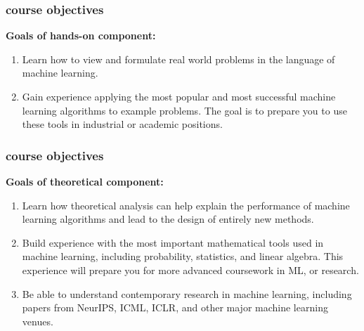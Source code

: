\documentclass[handout,compress]{beamer}
\begin{document}
\begin{frame}
	\frametitle{course objectives}
	\textbf{Goals of hands-on component:}
	\begin{enumerate}
		\item Learn how to view and formulate real world problems in the language of machine learning. 
		\item Gain experience applying the most popular and most successful machine learning algorithms to example problems. The goal is to prepare you to use these tools in industrial or academic positions.
	\end{enumerate}
\end{frame}

\begin{frame}
	\frametitle{course objectives}
	\textbf{Goals of theoretical component:}
	\begin{enumerate}
		\item Learn how theoretical analysis can help explain the performance of machine learning algorithms and lead to the design of entirely new methods.
		\item Build experience with the most important mathematical tools used in machine learning, including probability, statistics, and linear algebra. This experience will prepare you for more advanced coursework in ML, or research. 
		\item Be able to understand contemporary research in machine learning, including papers from NeurIPS, ICML, ICLR, and other major machine learning venues. 
	\end{enumerate}
\end{frame}
\end{document}
